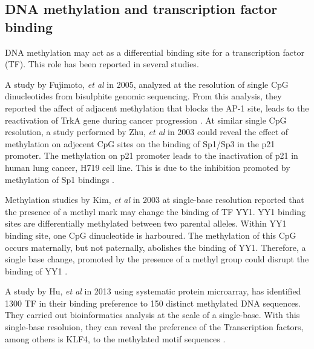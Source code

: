 \documentclass[review,12pt]{elsarticle}
\begin{document}

\subsection{DNA methylation and transcription factor binding}

    DNA methylation may act as a differential binding site for a transcription factor (TF). This role has been reported in several studies.

    A study by Fujimoto, \textit{et al} in 2005, analyzed at the resolution of single CpG dinucleotides from bisulphite genomic sequencing. 
    From this analysis, they reported the affect of adjacent methylation that blocks the AP-1 site, leads to the reactivation of TrkA gene during cancer progression \cite{fujimoto2005methylation}.
    At similar single CpG resolution, a study performed by Zhu, \textit{et al} in 2003 could reveal the effect of methylation on adjecent CpG sites on the binding of Sp1/Sp3 in the p21 promoter.
    The methylation on p21 promoter leads to the inactivation of p21 in human lung cancer, H719 cell line. 
    This is due to the inhibition promoted by methylation of Sp1 bindings \cite{zhu2003methylation}.

    Methylation studies by Kim, \textit{et al} in 2003 at single-base resolution reported that the presence of a methyl mark may change the binding of TF YY1.
    YY1 binding sites are differentially methylated between two parental alleles.
    Within YY1 binding site, one CpG dinucleotide is harboured.
    The methylation of this CpG occurs maternally, but not paternally, abolishes the binding of YY1.
    Therefore, a single base change, promoted by the presence of a methyl group could disrupt the binding of YY1 \cite{kim2003methylation}.

    A study by Hu, \textit{et al} in 2013 using systematic protein microarray, has identified 1300 TF in their binding preference to 150 distinct methylated DNA sequences. 
They carried out bioinformatics analysis at the scale of a single-base.
With this single-base resoluion, they can reveal the preference of the Transcription factors, among others is KLF4, to the methylated motif sequences \cite{hu2013dna}.
\end{document}
